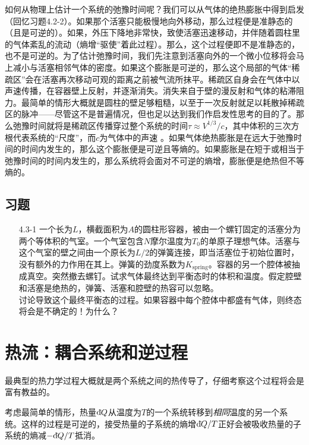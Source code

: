 如何从物理上估计一个系统的弛豫时间呢？我们可以从气体的绝热膨胀中得到启发（回忆习题4.2-2）。如果那个活塞只能极慢地向外移动，那么过程便是准静态的（且是可逆的）。如果，外压下降地非常快，致使活塞迅速移动，并伴随着圆柱里的气体紊乱的流动（熵增“驱使”着此过程）。那么，这个过程便即不是准静态的，也不是可逆的。为了估计弛豫时间，我们先注意到活塞向外的一个微小位移将会马上减小与活塞相邻气体的密度。如果这个膨胀是可逆的，那么这个局部的气体“稀疏区”会在活塞再次移动可观的距离之前被气流所抹平。稀疏区自身会在气体中以声速传播，在容器壁上反射，并逐渐消失。消失来自于壁的漫反射和气体的粘滞阻力。最简单的情形大概就是圆柱的壁足够粗糙，以至于一次反射就足以耗散掉稀疏区的脉冲——尽管这不是普遍情况，但也足以达到我们作启发性思考的目的了。那么弛豫时间就将是稀疏区传播穿过整个系统的时间$\tau\approx V^{1/3}/c$，其中体积的三次方根代表系统的“尺度”，而$c$为气体中的声速%
%
。如果气体绝热膨胀是在远大于弛豫时间的时间内发生的，那么这个膨胀便是可逆且等熵的。如果膨胀是在短于或相当于弛豫时间的时间内发生的，那么系统将会面对不可逆的熵增，膨胀便是绝热但不等熵的。

\subsection*{习题}
\begin{itemize}
\item[4.3-1] 一个长为$L$，横截面积为$A$的圆柱形容器，被由一个螺钉固定的活塞分为两个等体积的气室。一个气室包含$N$摩尔温度为$T_0$的单原子理想气体。活塞与这个气室的壁之间由一个原长为$L/2$的弹簧连接，即当活塞位于初始位置时，没有额外的力作用在其上。弹簧的劲度系数为$K_\text{spring}$。容器的另一个腔体被抽成真空。突然撤去螺钉。试求气体最终达到平衡态时的体积和温度。假定腔壁和活塞是绝热的，弹簧、活塞和腔壁的热容可以忽略。\\
讨论导致这个最终平衡态的过程。如果容器中每个腔体中都盛有气体，则终态将会是不确定的！为什么？
\end{itemize}

\section{热流：耦合系统和逆过程}
\label{sec4.4}
最典型的热力学过程大概就是两个系统之间的热传导了，仔细考察这个过程将会是富有教益的。

考虑最简单的情形，热量$\mathrm d\hspace*{-0.1em}\bar{}\hspace*{0.08em} Q$从温度为$T$的一个系统转移到{\it 相同}温度的另一个系统。这样的过程是可逆的，接受热量的子系统的熵增$\mathrm d\hspace*{-0.1em}\bar{}\hspace*{0.08em} Q/T$正好会被吸收热量的子系统的熵减$-\mathrm d\hspace*{-0.1em}\bar{}\hspace*{0.08em} Q/T$抵消。

